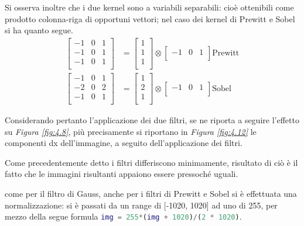 \documentclass{subfiles}
\begin{document}
Si osserva inoltre che i due kernel sono a variabili separabili: cioè ottenibili come prodotto colonna-riga di opportuni vettori;
nel caso dei kernel di Prewitt e Sobel si ha quanto segue.
\[\begin{aligned}
        \begin{bmatrix}
            -1 & 0 & 1 \\
            -1 & 0 & 1 \\
            -1 & 0 & 1 \\
        \end{bmatrix} & = \begin{bmatrix}
                              1 \\
                              1 \\
                              1 \\
                          \end{bmatrix} \otimes \begin{bmatrix}
                                                    -1 & 0 & 1 \\
                                                \end{bmatrix} \text{Prewitt} \\
        \begin{bmatrix}
            -1 & 0 & 1 \\
            -2 & 0 & 2 \\
            -1 & 0 & 1 \\
        \end{bmatrix} & = \begin{bmatrix}
                              1 \\
                              2 \\
                              1 \\
                          \end{bmatrix} \otimes \begin{bmatrix}
                                                    -1 & 0 & 1 \\
                                                \end{bmatrix} \text{Sobel}
    \end{aligned}
\]

Considerando pertanto l'applicazione dei due filtri, se ne riporta a seguire l'effetto su \emph{Figura \ref{fig:4.8}},
più precisamente si riportano in \emph{Figura \ref{fig:4.12}} le componenti dx dell'immagine, a seguito dell'applicazione dei filtri.


Come precedentemente detto i filtri differiscono minimamente, risultato di ciò è il fatto che le immagini risultanti appaiono essere pressoché uguali.
\begin{Note*}
    come per il filtro di Gauss, anche per i filtri di Prewitt e Sobel si è effettuata una normalizzazione: si è passati da un range di [-1020, 1020] ad uno di 255,
    per mezzo della segue formula \lstinline[language = MATLAB]{img = 255*(img + 1020)/(2 * 1020)}.
\end{Note*}
\end{document}
